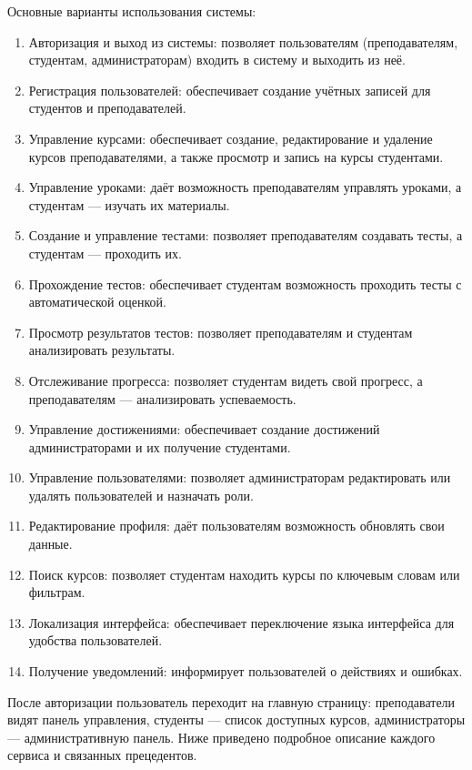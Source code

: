 Основные варианты использования системы:

\begin{enumerate}
	\item Авторизация и выход из системы: позволяет пользователям (преподавателям, студентам, администраторам) входить в систему и выходить из неё.
	\item Регистрация пользователей: обеспечивает создание учётных записей для студентов и преподавателей.
	\item Управление курсами: обеспечивает создание, редактирование и удаление курсов преподавателями, а также просмотр и запись на курсы студентами.
	\item Управление уроками: даёт возможность преподавателям управлять уроками, а студентам — изучать их материалы.
	\item Создание и управление тестами: позволяет преподавателям создавать тесты, а студентам — проходить их.
	\item Прохождение тестов: обеспечивает студентам возможность проходить тесты с автоматической оценкой.
	\item Просмотр результатов тестов: позволяет преподавателям и студентам анализировать результаты.
	\item Отслеживание прогресса: позволяет студентам видеть свой прогресс, а преподавателям — анализировать успеваемость.
	\item Управление достижениями: обеспечивает создание достижений администраторами и их получение студентами.
	\item Управление пользователями: позволяет администраторам редактировать или удалять пользователей и назначать роли.
	\item Редактирование профиля: даёт пользователям возможность обновлять свои данные.
	\item Поиск курсов: позволяет студентам находить курсы по ключевым словам или фильтрам.
	\item Локализация интерфейса: обеспечивает переключение языка интерфейса для удобства пользователей.
	\item Получение уведомлений: информирует пользователей о действиях и ошибках.
\end{enumerate}

После авторизации пользователь переходит на главную страницу: преподаватели видят панель управления, студенты — список доступных курсов, администраторы — административную панель. Ниже приведено подробное описание каждого сервиса и связанных прецедентов.

